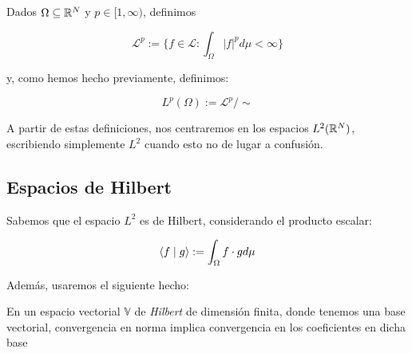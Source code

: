 \begin{definicion}
    Dados $\Omega \subseteq \mathbb{R}^N$ y $p \in [1, \infty)$, definimos

    \begin{equation}
        \mathcal{L}^p := \{ f \in \mathcal{L} : \int_{\Omega} |f|^p d\mu < \infty \}
    \end{equation}

    y, como hemos hecho previamente, definimos:

    \begin{equation}
        L^p(\Omega) := \mathcal{L}^p / \sim
    \end{equation}

\end{definicion}

A partir de estas definiciones, nos centraremos en los espacios $L^2(\mathbb{R}^N)$, escribiendo simplemente $L^2$ cuando esto no de lugar a confusión.

\subsection{Espacios de Hilbert}

Sabemos que el espacio $L^2$ es de Hilbert, considerando el producto escalar:

\begin{equation}
    \langle f \; | \; g \rangle := \int_{\Omega} f \cdot g d\mu
\end{equation}

Además, usaremos el siguiente hecho:

\begin{proposicion}
    En un espacio vectorial $\mathbb{V}$ de \textit{Hilbert} de dimensión finita, donde tenemos una base vectorial, convergencia en norma implica convergencia en los coeficientes en dicha base
\end{proposicion}

